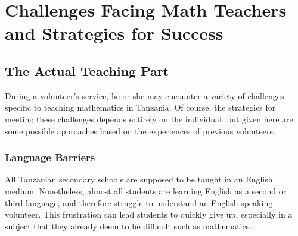 \chapter{Challenges Facing Math Teachers and Strategies for Success}

\section{The Actual Teaching Part}
During a volunteer's service, he or she may encounter a variety of challenges specific to teaching mathematics in Tanzania. Of course, the strategies for meeting these challenges depends entirely on the individual, but given here are some possible approaches based on the experiences of previous volunteers.

\subsection{Language Barriers}
All Tanzanian secondary schools are supposed to be taught in an English medium. Nonetheless, almost all students are learning English as a second or third language, and therefore struggle to understand an English-speaking volunteer. This frustration can lead students to quickly give up, especially in a subject that they already deem to be difficult such as mathematics.\\

